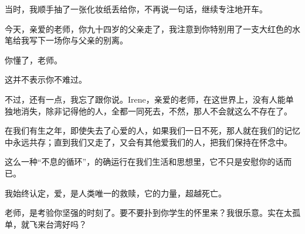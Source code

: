 \par 当时，我顺手抽了一张化妆纸丢给你，不再说一句话，继续专注地开车。
\par 今天，亲爱的老师，你九十四岁的父亲走了，我注意到你特别用了一支大红色的水笔给我写下一场你与父亲的别离。
\par 你懂了，老师。
\par 这并不表示你不难过。
\par 不过，还有一点，我忘了跟你说。Irene，亲爱的老师，在这世界上，没有人能单独地消失，除非记得他的人，全都一同死去，不然，那人不会就这么不存在了。
\par 在我们有生之年，即使失去了心爱的人，如果我们一日不死，那人就在我们的记忆中永远共存；直到我们又走了，又会有其他爱我们的人，把我们保持在怀念中。
\par 这么一种“不息的循环”，的确运行在我们生活和思想里，它不只是安慰你的话而已。
\par 我始终认定，爱，是人类唯一的救赎，它的力量，超越死亡。
\par 老师，是考验你坚强的时刻了。要不要扑到你学生的怀里来？我很乐意。实在太孤单，就飞来台湾好吗？
\par {}

